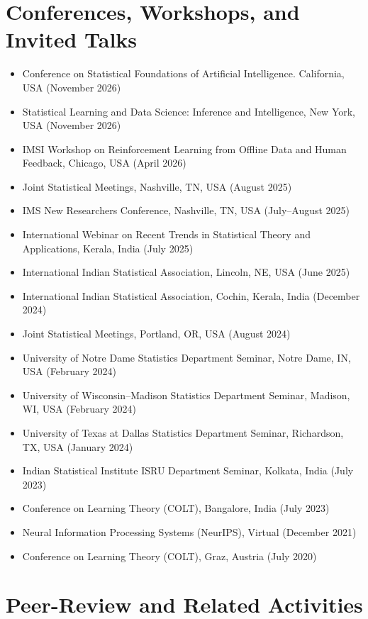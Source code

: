 \documentclass[11pt]{article}
\begin{document}
	\section*{Conferences, Workshops, and Invited Talks}
	\begin{itemize}
		\item Conference on Statistical Foundations of Artificial Intelligence. California, USA (November 2026)
		\item Statistical Learning and Data Science: Inference and Intelligence, New York, USA (November 2026)
		\item IMSI Workshop on Reinforcement Learning from Offline Data and Human Feedback, Chicago, USA (April 2026)
		\item Joint Statistical Meetings, Nashville, TN, USA (August 2025)
		\item IMS New Researchers Conference, Nashville, TN, USA (July--August 2025)
		\item International Webinar on Recent Trends in Statistical Theory and Applications, Kerala, India (July 2025)
		\item International Indian Statistical Association, Lincoln, NE, USA (June 2025)
		\item International Indian Statistical Association, Cochin, Kerala, India (December 2024)
		\item Joint Statistical Meetings, Portland, OR, USA (August 2024)
		\item University of Notre Dame Statistics Department Seminar, Notre Dame, IN, USA (February 2024)
		\item University of Wisconsin--Madison Statistics Department Seminar, Madison, WI, USA (February 2024)
		\item University of Texas at Dallas Statistics Department Seminar, Richardson, TX, USA (January 2024)
		\item Indian Statistical Institute ISRU Department Seminar, Kolkata, India (July 2023)
		\item Conference on Learning Theory (COLT), Bangalore, India (July 2023)
		\item Neural Information Processing Systems (NeurIPS), Virtual (December 2021)
		\item Conference on Learning Theory (COLT), Graz, Austria (July 2020)
	\end{itemize}
	
	\section*{Peer-Review and Related Activities}
	
\end{document}

